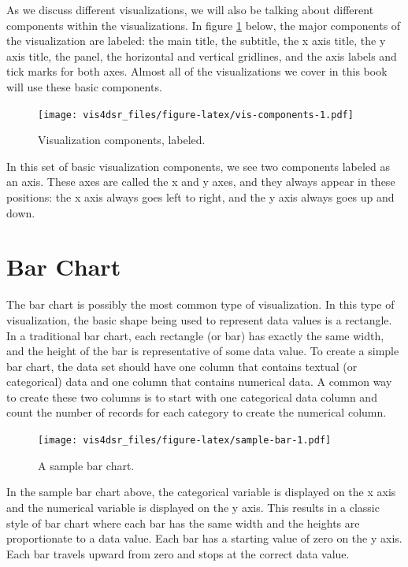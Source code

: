 \documentclass[
]{krantz}
\begin{document}
As we discuss different visualizations, we will also be talking about different
components within the visualizations. In figure \ref{fig:vis-components} below,
the major components of the visualization are labeled: the main title, the subtitle,
the x axis title, the y axis title, the panel, the horizontal and vertical gridlines,
and the axis labels and tick marks for both axes. Almost all of the visualizations we cover
in this book will use these basic components.

\begin{figure}
\centering
\texttt{[image: vis4dsr\_files/figure-latex/vis-components-1.pdf]}
\caption{\label{fig:vis-components}Visualization components, labeled.}
\end{figure}

In this set of basic visualization components, we see two components labeled as an axis.
These axes are called the x and y axes, and they always appear in these positions:
the x axis always goes left to right, and the y axis always goes up and down.

\hypertarget{bar-chart}{%
\section{Bar Chart}\label{bar-chart}}

The bar chart is possibly the most common type of visualization. In this type
of visualization, the basic shape being used to represent data values is a rectangle.
In a traditional bar chart, each rectangle (or bar) has exactly the same width,
and the height of the bar is representative of some data value. To create a simple
bar chart, the data set should have one column that contains textual (or categorical)
data and one column that contains numerical data. A common way to create these two columns
is to start with one categorical data column and count the number of records for each
category to create the numerical column.

\begin{figure}
\centering
\texttt{[image: vis4dsr\_files/figure-latex/sample-bar-1.pdf]}
\caption{\label{fig:sample-bar}A sample bar chart.}
\end{figure}

In the sample bar chart above, the categorical variable is displayed on the
x axis and the numerical variable is displayed on the y axis. This results in a
classic style of bar chart where each bar has the same width and the heights are
proportionate to a data value. Each bar has a starting value of zero on the y axis.
Each bar travels upward from zero and stops at the correct data value.
\end{document}
